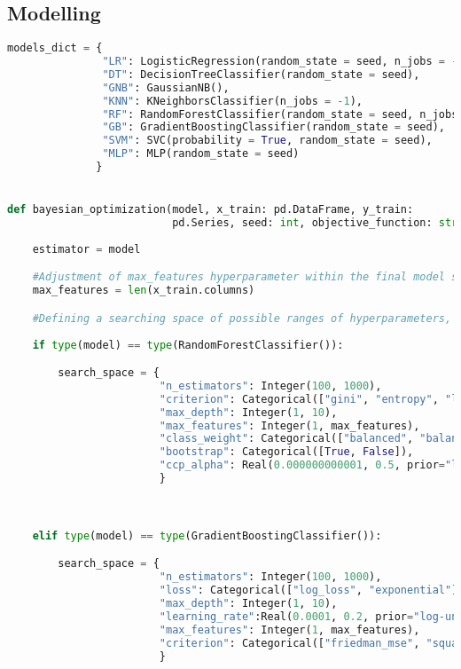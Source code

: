 \subsection{Modelling}
\begin{lstlisting}[language=Python, basicstyle=\footnotesize\ttfamily]
models_dict = {
               "LR": LogisticRegression(random_state = seed, n_jobs = -1),
               "DT": DecisionTreeClassifier(random_state = seed),
               "GNB": GaussianNB(),
               "KNN": KNeighborsClassifier(n_jobs = -1), 
               "RF": RandomForestClassifier(random_state = seed, n_jobs = -1),
               "GB": GradientBoostingClassifier(random_state = seed),
               "SVM": SVC(probability = True, random_state = seed),
               "MLP": MLP(random_state = seed)
              }


def bayesian_optimization(model, x_train: pd.DataFrame, y_train:
                          pd.Series, seed: int, objective_function: str = "f1"):
    
    estimator = model

    #Adjustment of max_features hyperparameter within the final model selection.
    max_features = len(x_train.columns)

    #Defining a searching space of possible ranges of hyperparameters, given the model.
    
    if type(model) == type(RandomForestClassifier()):

        search_space = {
                        "n_estimators": Integer(100, 1000),
                        "criterion": Categorical(["gini", "entropy", "log_loss"]),
                        "max_depth": Integer(1, 10),
                        "max_features": Integer(1, max_features),
                        "class_weight": Categorical(["balanced", "balanced_subsample", None]),
                        "bootstrap": Categorical([True, False]),
                        "ccp_alpha": Real(0.000000000001, 0.5, prior="log-uniform"),
                        }



    elif type(model) == type(GradientBoostingClassifier()):

        search_space = {
                        "n_estimators": Integer(100, 1000),
                        "loss": Categorical(["log_loss", "exponential"]),
                        "max_depth": Integer(1, 10),
                        "learning_rate":Real(0.0001, 0.2, prior="log-uniform"),
                        "max_features": Integer(1, max_features),
                        "criterion": Categorical(["friedman_mse", "squared_error"]),
                        }




\end{lstlisting}
